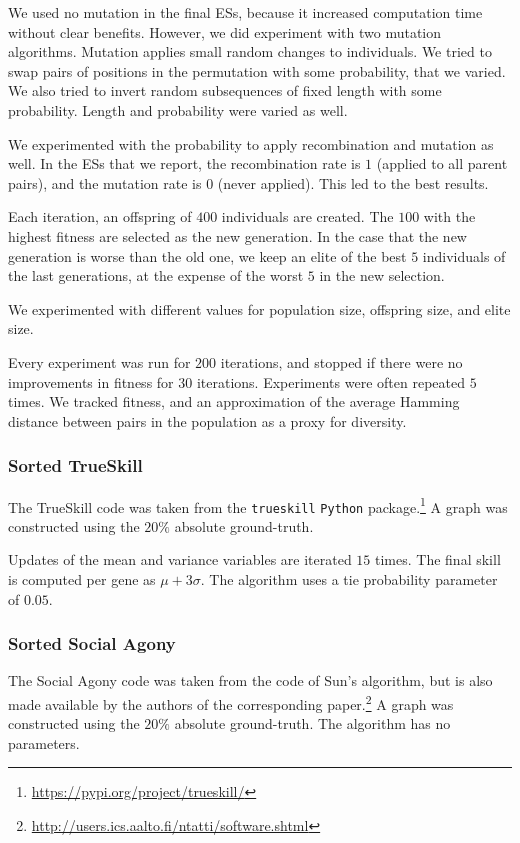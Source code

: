 We used no mutation in the final ESs, because it increased computation time without clear benefits. However, we did experiment with two mutation algorithms. Mutation applies small random changes to individuals. We tried to swap pairs of positions in the permutation with some probability, that we varied. We also tried to invert random subsequences of fixed length with some probability. Length and probability were varied as well.

We experimented with the probability to apply recombination and mutation as well. In the ESs that we report, the recombination rate is $1$ (applied to all parent pairs), and the mutation rate is $0$ (never applied). This led to the best results. 

Each iteration, an offspring of $400$ individuals are created. The $100$ with the highest fitness are selected as the new generation. In the case that the new generation is worse than the old one, we keep an elite of the best $5$ individuals of the last generations, at the expense of the worst $5$ in the new selection. 

We experimented with different values for population size, offspring size, and elite size.

Every experiment was run for $200$ iterations, and stopped if there were no improvements in fitness for $30$ iterations. Experiments were often repeated $5$ times. We tracked fitness, and an approximation of the average Hamming distance between pairs in the population as a proxy for diversity.


\subsubsection{Sorted TrueSkill}

The TrueSkill code was taken from the \texttt{trueskill} \texttt{Python} package.\footnote{\href{https://pypi.org/project/trueskill/}{https://pypi.org/project/trueskill/}} A graph was constructed using the $20\%$ absolute ground-truth.

Updates of the mean and variance variables are iterated $15$ times. The final skill is computed per gene as $\mu + 3\sigma$. The algorithm uses a tie probability parameter of $0.05$.


\subsubsection{Sorted Social Agony}

The Social Agony code was taken from the code of Sun's algorithm, but is also made available by the authors of the corresponding paper.\footnote{\href{http://users.ics.aalto.fi/ntatti/software.shtml}{http://users.ics.aalto.fi/ntatti/software.shtml}} A graph was constructed using the $20\%$ absolute ground-truth. The algorithm has no parameters.



